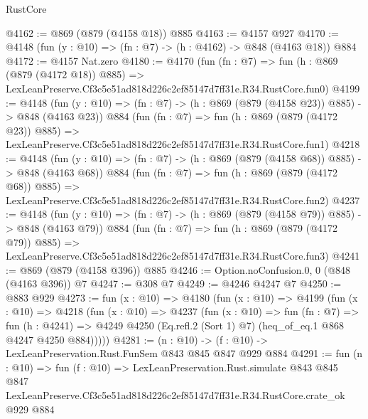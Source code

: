\begin{lexlean}{RustCore}
\begin{coremodule}
@4162 := @869 (@879 (@4158 @18)) @885
@4163 := @4157 @927
@4170 := @4148 (fun (y : @10) => (fn : @7) -> (h : @4162) -> @848 (@4163 @18)) @884
@4172 := @4157 Nat.zero
@4180 := @4170
    (fun (fn : @7) =>
    fun (h : @869 (@879 (@4172 @18)) @885) =>
    LexLeanPreserve.Cf3c5e51ad818d226c2ef85147d7ff31e.R34.RustCore.fun0)
@4199 := @4148
    (fun (y : @10) => (fn : @7) -> (h : @869 (@879 (@4158 @23)) @885) -> @848 (@4163 @23))
    @884
    (fun (fn : @7) =>
    fun (h : @869 (@879 (@4172 @23)) @885) =>
    LexLeanPreserve.Cf3c5e51ad818d226c2ef85147d7ff31e.R34.RustCore.fun1)
@4218 := @4148
    (fun (y : @10) => (fn : @7) -> (h : @869 (@879 (@4158 @68)) @885) -> @848 (@4163 @68))
    @884
    (fun (fn : @7) =>
    fun (h : @869 (@879 (@4172 @68)) @885) =>
    LexLeanPreserve.Cf3c5e51ad818d226c2ef85147d7ff31e.R34.RustCore.fun2)
@4237 := @4148
    (fun (y : @10) => (fn : @7) -> (h : @869 (@879 (@4158 @79)) @885) -> @848 (@4163 @79))
    @884
    (fun (fn : @7) =>
    fun (h : @869 (@879 (@4172 @79)) @885) =>
    LexLeanPreserve.Cf3c5e51ad818d226c2ef85147d7ff31e.R34.RustCore.fun3)
@4241 := @869 (@879 (@4158 @396)) @885
@4246 := Option.noConfusion.{0, 0} (@848 (@4163 @396)) @7
@4247 := @308 @7
@4249 := @4246 @4247 @7
@4250 := @883 @929
@4273 := fun (x : @10) =>
  @4180
    (fun (x : @10) =>
    @4199
      (fun (x : @10) =>
      @4218
        (fun (x : @10) =>
        @4237
          (fun (x : @10) =>
          fun (fn : @7) =>
          fun (h : @4241) =>
          @4249 @4250 (Eq.refl.{2} (Sort 1) @7) (heq_of_eq.{1} @868 @4247 @4250 @884)))))
@4281 := (n : @10) -> (f : @10) -> LexLeanPreservation.Rust.FunSem @843 @845 @847 @929 @884
@4291 := fun (n : @10) =>
  fun (f : @10) =>
  LexLeanPreservation.Rust.simulate
    @843
    @845
    @847
    LexLeanPreserve.Cf3c5e51ad818d226c2ef85147d7ff31e.R34.RustCore.crate_ok
    @929
    @884
\end{coremodule}
\end{lexlean}
